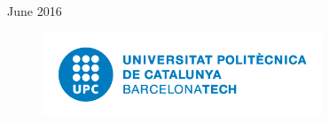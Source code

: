 \begin{titlepage}


{\large June 2016}\\[3cm] %


 

\begin{figure}[h]
  \centering
     \includegraphics[height=2.5cm]{Img/upc_logos/UPC-positiu-p3005.png}
\end{figure}

\vspace*{\fill} %

\end{titlepage}
